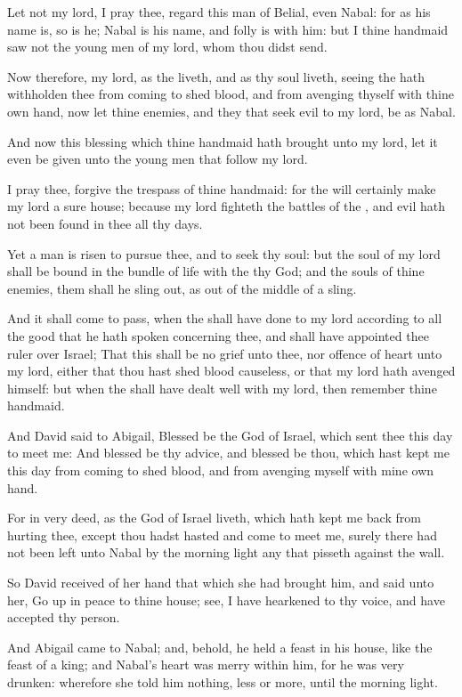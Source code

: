 \Verse Let not my lord, I pray thee, regard this man of Belial, even Nabal: for as his name is, so is he; Nabal is his name, and folly is with him: but I thine handmaid saw not the young men of my lord, whom thou didst send.

\Verse Now therefore, my lord, as the \LORD liveth, and as thy soul liveth, seeing the \LORD hath withholden thee from coming to shed blood, and from avenging thyself with thine own hand, now let thine enemies, and they that seek evil to my lord, be as Nabal.

\Verse And now this blessing which thine handmaid hath brought unto my lord, let it even be given unto the young men that follow my lord.

\Verse I pray thee, forgive the trespass of thine handmaid: for the \LORD will certainly make my lord a sure house; because my lord fighteth the battles of the \LORD, and evil hath not been found in thee all thy days.

\Verse Yet a man is risen to pursue thee, and to seek thy soul: but the soul of my lord shall be bound in the bundle of life with the \LORD thy God; and the souls of thine enemies, them shall he sling out, as out of the middle of a sling.

\Verse And it shall come to pass, when the \LORD shall have done to my lord according to all the good that he hath spoken concerning thee, and shall have appointed thee ruler over Israel; \Verse That this shall be no grief unto thee, nor offence of heart unto my lord, either that thou hast shed blood causeless, or that my lord hath avenged himself: but when the \LORD shall have dealt well with my lord, then remember thine handmaid.

\Verse And David said to Abigail, Blessed be the \LORD God of Israel, which sent thee this day to meet me: \Verse And blessed be thy advice, and blessed be thou, which hast kept me this day from coming to shed blood, and from avenging myself with mine own hand.

\Verse For in very deed, as the \LORD God of Israel liveth, which hath kept me back from hurting thee, except thou hadst hasted and come to meet me, surely there had not been left unto Nabal by the morning light any that pisseth against the wall.

\Verse So David received of her hand that which she had brought him, and said unto her, Go up in peace to thine house; see, I have hearkened to thy voice, and have accepted thy person.

\Verse And Abigail came to Nabal; and, behold, he held a feast in his house, like the feast of a king; and Nabal's heart was merry within him, for he was very drunken: wherefore she told him nothing, less or more, until the morning light.

